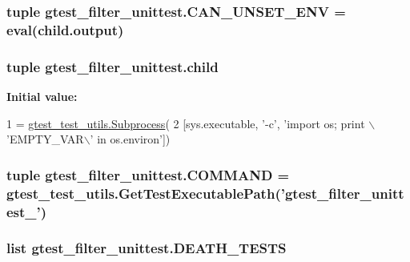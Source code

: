 \hypertarget{namespacegtest__filter__unittest_af361c1fbfcd7dccb753d66208bd86a4e}{
\subsubsection[{C\-A\-N\-\_\-\-U\-N\-S\-E\-T\-\_\-\-E\-N\-V}]{\setlength{\rightskip}{0pt plus 5cm}tuple gtest\-\_\-filter\-\_\-unittest.\-C\-A\-N\-\_\-\-U\-N\-S\-E\-T\-\_\-\-E\-N\-V = eval(child.\-output)}}\label{namespacegtest__filter__unittest_af361c1fbfcd7dccb753d66208bd86a4e}
\hypertarget{namespacegtest__filter__unittest_a158829096400f19be6d8a3ef8ca8b76a}{
\subsubsection[{child}]{\setlength{\rightskip}{0pt plus 5cm}tuple gtest\-\_\-filter\-\_\-unittest.\-child}}\label{namespacegtest__filter__unittest_a158829096400f19be6d8a3ef8ca8b76a}
{\bfseries Initial value\-:}
\begin{DoxyCode}
1 = \hyperlink{classgtest__test__utils_1_1_subprocess}{gtest\_test\_utils.Subprocess}(
2     [sys.executable, \textcolor{stringliteral}{'-c'}, \textcolor{stringliteral}{'import os; print \(\backslash\)'EMPTY\_VAR\(\backslash\)' in os.environ'}])
\end{DoxyCode}
\hypertarget{namespacegtest__filter__unittest_a37a3f33245e16e9733ae3568e623b837}{
\subsubsection[{C\-O\-M\-M\-A\-N\-D}]{\setlength{\rightskip}{0pt plus 5cm}tuple gtest\-\_\-filter\-\_\-unittest.\-C\-O\-M\-M\-A\-N\-D = {\bf gtest\-\_\-test\-\_\-utils.\-Get\-Test\-Executable\-Path}('gtest\-\_\-filter\-\_\-unittest\-\_\-')}}\label{namespacegtest__filter__unittest_a37a3f33245e16e9733ae3568e623b837}
\hypertarget{namespacegtest__filter__unittest_ab14d082dc05c07458595606a64616d0b}{
\subsubsection[{D\-E\-A\-T\-H\-\_\-\-T\-E\-S\-T\-S}]{\setlength{\rightskip}{0pt plus 5cm}list gtest\-\_\-filter\-\_\-unittest.\-D\-E\-A\-T\-H\-\_\-\-T\-E\-S\-T\-S}}\label{namespacegtest__filter__unittest_ab14d082dc05c07458595606a64616d0b}
